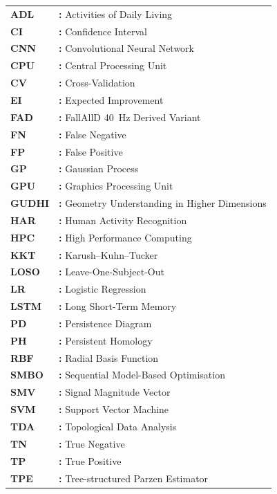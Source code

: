\hspace{-3mm}
\begin{tabular}{p{2.2cm}l}
{\bf ADL}   & {\bf:} Activities of Daily Living\\
{\bf CI}    & {\bf:} Confidence Interval\\
{\bf CNN}   & {\bf:} Convolutional Neural Network\\
{\bf CPU}   & {\bf:} Central Processing Unit\\
{\bf CV}    & {\bf:} Cross-Validation\\
{\bf EI}    & {\bf:} Expected Improvement\\
{\bf FAD}   & {\bf:} FallAllD 40~Hz Derived Variant\\
{\bf FN}    & {\bf:} False Negative\\
{\bf FP}    & {\bf:} False Positive\\
{\bf GP}    & {\bf:} Gaussian Process\\
{\bf GPU}   & {\bf:} Graphics Processing Unit\\
{\bf GUDHI} & {\bf:} Geometry Understanding in Higher Dimensions\\
{\bf HAR}   & {\bf:} Human Activity Recognition\\
{\bf HPC}   & {\bf:} High Performance Computing\\
{\bf KKT}   & {\bf:} Karush--Kuhn--Tucker\\
{\bf LOSO}  & {\bf:} Leave-One-Subject-Out\\
{\bf LR}    & {\bf:} Logistic Regression\\
{\bf LSTM}  & {\bf:} Long Short-Term Memory\\
{\bf PD}    & {\bf:} Persistence Diagram\\
{\bf PH}    & {\bf:} Persistent Homology\\
{\bf RBF}   & {\bf:} Radial Basis Function\\
{\bf SMBO}  & {\bf:} Sequential Model-Based Optimisation\\
{\bf SMV}   & {\bf:} Signal Magnitude Vector\\
{\bf SVM}   & {\bf:} Support Vector Machine\\
{\bf TDA}   & {\bf:} Topological Data Analysis\\
{\bf TN}    & {\bf:} True Negative\\
{\bf TP}    & {\bf:} True Positive\\
{\bf TPE}   & {\bf:} Tree-structured Parzen Estimator\\
\end{tabular}
